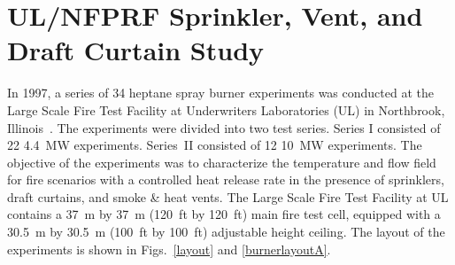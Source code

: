 \section{UL/NFPRF Sprinkler, Vent, and Draft Curtain Study}
\label{UL_NFPRF_Description}

In 1997, a series of 34 heptane spray burner experiments was conducted at the Large Scale Fire Test Facility at Underwriters Laboratories
(UL) in Northbrook, Illinois~\cite{Sheppard:1}. The experiments were divided into two test series. Series I consisted of 22 4.4~MW experiments. Series~II consisted
of 12 10~MW experiments. The objective of the experiments was to characterize the temperature and flow field for fire
scenarios with a controlled heat release rate in the presence of sprinklers, draft curtains, and smoke \& heat vents.
The Large Scale Fire Test Facility at UL contains a 37~m by 37~m (120~ft by 120~ft) main fire test cell, equipped with a 30.5~m by 30.5~m (100~ft by
100~ft) adjustable height ceiling. The layout of the experiments is shown in Figs.~\ref{layout} and \ref{burnerlayoutA}.

